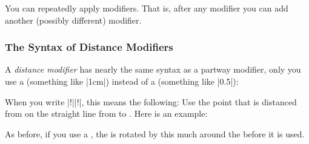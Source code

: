 \begin{codeexample}[]
\end{codeexample}

You can repeatedly apply modifiers. That is, after any modifier you can add
another (possibly different) modifier.
%
\begin{codeexample}[]
\end{codeexample}


\subsubsection{The Syntax of Distance Modifiers}

A \emph{distance modifier} has nearly the same syntax as a partway modifier,
only you use a  (something like |1cm|) instead of a
 (something like |0.5|):
%
\begin{quote}
\end{quote}

When you write |!||!|, this means the
following: Use the point that is distanced  from  on
the straight line from  to . Here is an example:
%
\begin{codeexample}[]
\end{codeexample}

As before, if you use a , the  is rotated
by this much around the  before it is used.

